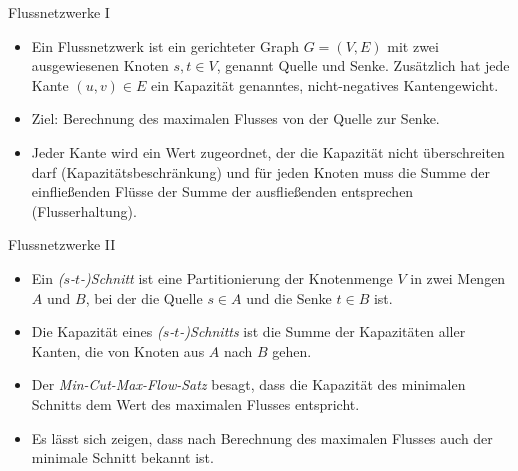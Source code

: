 \documentclass[wide,xcolor={x11names},hyperref={colorlinks=false},pantone312]{beamer}
\begin{document}
\begin{frame}[t]{Flussnetzwerke I}
	\footnotesize
	\begin{itemize}
		\item Ein Flussnetzwerk ist ein gerichteter Graph $G = (V,E)$ mit zwei ausgewiesenen Knoten $s, t \in V$, genannt Quelle und Senke. Zusätzlich hat jede Kante $(u,v) \in E$ ein Kapazität genanntes, nicht-negatives Kantengewicht. \cite{CLRS92} \\
		\begin{center}
		\end{center}
		\item Ziel: Berechnung des maximalen Flusses von der Quelle zur Senke. 
		\item Jeder Kante wird ein Wert zugeordnet, der die Kapazität nicht überschreiten darf (Kapazitätsbeschränkung) und für jeden Knoten muss die Summe der einfließenden Flüsse der Summe der ausfließenden entsprechen (Flusserhaltung).
		\normalsize
	\end{itemize}
\end{frame}

\begin{frame}[t]{Flussnetzwerke II}
	\begin{itemize}
		\item Ein \emph{($s$-$t$-)Schnitt} ist eine Partitionierung der Knotenmenge $V$ in zwei Mengen $A$ und $B$, bei der die Quelle $s \in A$ und die Senke $t \in B$ ist.
		\item Die Kapazität eines \emph{($s$-$t$-)Schnitts} ist die Summe der Kapazitäten aller Kanten, die von Knoten aus $A$ nach $B$ gehen.
		\item Der \emph{Min-Cut-Max-Flow-Satz} besagt, dass die Kapazität des minimalen Schnitts dem Wert des maximalen Flusses entspricht.
		\item Es lässt sich zeigen, dass nach Berechnung des maximalen Flusses auch der minimale Schnitt bekannt ist. \cite{CLRS92}
	\end{itemize}
\end{frame}
\end{document}
